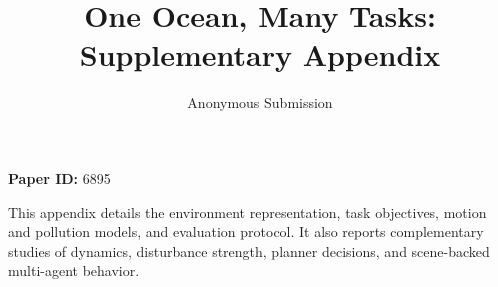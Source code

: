 \documentclass[letterpaper]{article}
\title{One Ocean, Many Tasks: Supplementary Appendix}
\author{Anonymous Submission}
\begin{document}
\maketitle

\noindent\textbf{Paper ID:} 6895\par
\noindent This appendix details the environment representation, task objectives, motion and pollution models, and evaluation protocol. It also reports complementary studies of dynamics, disturbance strength, planner decisions, and scene-backed multi-agent behavior.

\appendix
\renewcommand{\thefigure}{A\arabic{figure}}
\renewcommand{\thetable}{A\arabic{table}}
\renewcommand{\theequation}{A\arabic{equation}}








\end{document}
